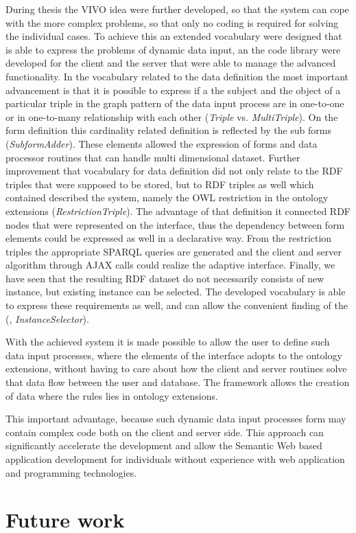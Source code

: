 During thesis the VIVO idea were further developed, so that the system can cope with the more complex problems, so that only no coding is required for solving the individual cases. To achieve this an extended vocabulary were designed that is able to express the problems of dynamic data input, an the code library were developed for the client and the server that were able to manage the advanced functionality. In the vocabulary related to the data definition the most important advancement is that it is possible to express if a the subject and the object of a particular triple in the graph pattern of the data input process are in one-to-one or in one-to-many relationship with each other (\textit{Triple} vs. \textit{MultiTriple}). On the form definition this cardinality related definition is reflected by the sub forms (\textit{SubformAdder}). These elements allowed the expression of forms and data processor routines that can handle multi dimensional dataset. Further improvement that vocabulary for data definition did not only relate to the RDF triples that were supposed to be stored, but to RDF triples as well which contained described the system, namely the OWL restriction in the ontology extensions (\textit{RestrictionTriple}). The advantage of that definition it connected RDF nodes that were represented on the interface, thus the dependency between form elements could be expressed as well in a declarative way. From the restriction triples the appropriate SPARQL queries are generated and the client and server algorithm through AJAX calls could realize the adaptive interface. Finally, we have seen that the resulting RDF dataset do not necessarily consists of new instance, but existing instance can be selected. The developed vocabulary is able to express these requirements as well, and can allow the convenient finding of the (, \textit{InstanceSelector}). 


With the achieved system it is made possible to allow the user to define such data input processes, where the elements of the interface adopts to the ontology extensions, without having to care about how the client and server routines solve that data flow between the user and database. The framework allows the creation of data where the rules lies in ontology extensions. 

This important advantage, because such dynamic data input processes form may contain complex code both on the client and server side. This approach can significantly accelerate the development and allow the Semantic Web based application development for individuals without experience with web application and programming technologies.

\section{Future work}


